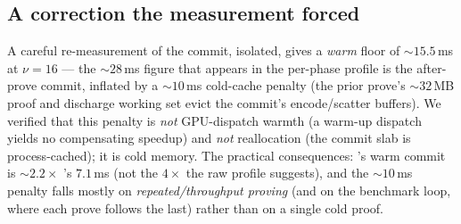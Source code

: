 \subsection{A correction the measurement forced}
\label{sec:res-commit}

A careful re-measurement of the \zinc{} commit, isolated, gives a
\emph{warm} floor of $\sim$$15.5$\,ms at $\nu{=}16$ --- the
$\sim$$28$\,ms figure that appears in the per-phase profile is the
after-prove commit, inflated by a $\sim$$10$\,ms cold-cache penalty (the
prior prove's $\sim$$32$\,MB proof and discharge working set evict the
commit's encode/scatter buffers). We verified that this penalty is
\emph{not} GPU-dispatch warmth (a warm-up dispatch yields no compensating
speedup) and \emph{not} reallocation (the commit slab is process-cached);
it is cold memory. The practical consequences: \zinc{}'s warm commit is
$\sim$$2.2\times$ \binius{}'s $7.1$\,ms (not the $4\times$ the raw profile
suggests), and the $\sim$$10$\,ms penalty falls mostly on
\emph{repeated/throughput proving} (and on the benchmark loop, where each
prove follows the last) rather than on a single cold proof.

